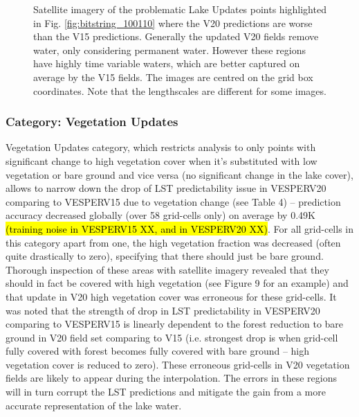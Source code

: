 \documentclass[hess, twostagejnl]{copernicus}
\begin{document}
\begin{figure}
	\caption{Satellite imagery of the problematic Lake Updates points highlighted in Fig. \ref{fig:bitstring_100110} where the V20 predictions are worse than the V15 predictions. Generally the updated V20 fields remove water, only considering permanent water. However these regions have highly time variable waters, which are better captured on average by the V15 fields. The images are centred on the grid box coordinates. Note that the lengthscales are different for some images.} 
	\label{fig:example_test}
\end{figure}



\subsubsection{Category: Vegetation Updates}
Vegetation Updates category, which restricts analysis to only points with significant change to high vegetation cover when it’s substituted with low vegetation or bare ground and vice versa (no significant change in the lake cover), allows to narrow down the drop of LST predictability issue in VESPERV20 comparing to VESPERV15 due to vegetation change (see Table 4) – prediction accuracy decreased globally (over 58 grid-cells only) on average by 0.49K \hl{(training noise in VESPERV15 XX, and in VESPERV20 XX)}. For all grid-cells in this category apart from one, the high vegetation fraction was decreased (often quite drastically to zero), specifying that there should just be bare ground. Thorough inspection of these areas with satellite imagery revealed that they should in fact be covered with high vegetation (see Figure 9 for an example) and that update in V20 high vegetation cover was erroneous for these grid-cells. It was noted that the strength of drop in LST predictability in VESPERV20 comparing to VESPERV15 is linearly dependent to the forest reduction to bare ground in V20 field set comparing to V15 (i.e. strongest drop is when grid-cell fully covered with forest becomes fully covered with bare ground – high vegetation cover is reduced to zero). These erroneous grid-cells in V20 vegetation fields are likely to appear during the interpolation. The errors in these regions will in turn corrupt the LST predictions and mitigate the gain from a more accurate representation of the lake water.
\end{document}
